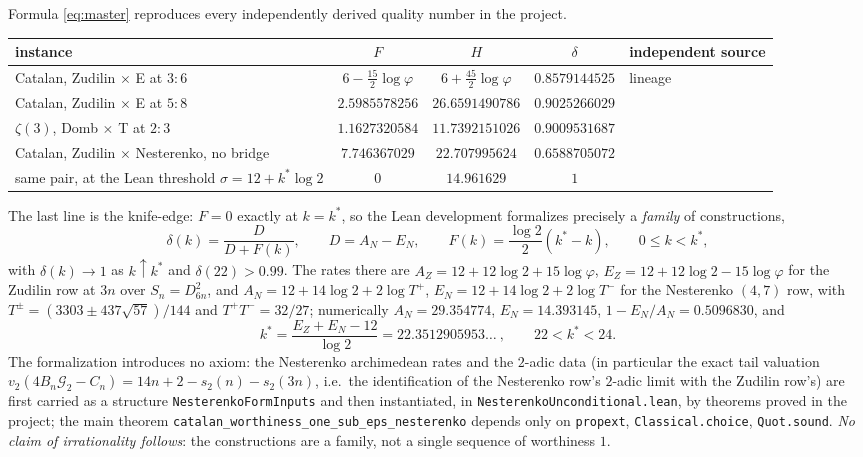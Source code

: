 \begin{remark}[calibration]\label{rem:calibration}
Formula \eqref{eq:master} reproduces every independently derived quality
number in the project.
\begin{center}
\renewcommand{\arraystretch}{1.2}
\begin{tabular}{@{}l c c c l@{}}
\toprule
instance & $F$ & $H$ & $\delta$ & independent source\\
\midrule
Catalan, Zudilin $\times$ E at $3{:}6$ & $6-\tfrac{15}2\log\varphi$ &
$6+\tfrac{45}2\log\varphi$ & $0.8579144525$ & \cite{ProjCatalan58} lineage\\
Catalan, Zudilin $\times$ E at $5{:}8$ & $2.5985578256$ & $26.6591490786$ &
$0.9025266029$ & \cite{ProjCatalan58}\\
$\zeta(3)$, Domb $\times$ T at $2{:}3$ & $1.1627320584$ & $11.7392151026$ &
$0.9009531687$ & \cite{ProjZeta3}\\
Catalan, Zudilin $\times$ Nesterenko, no bridge & $7.746367029$ &
$22.707995624$ & $0.6588705072$ & \cite{ProjCatalanLCM}\\
same pair, at the Lean threshold $\sigma=12+k^*\log2$ & $0$ & $14.961629$ &
$1$ & \cite{LeanCatalan}\\
\bottomrule
\end{tabular}
\end{center}
The last line is the knife-edge: $F=0$ exactly at $k=k^*$, so the Lean
development formalizes precisely a \emph{family} of constructions,
\[
\delta(k)=\frac{D}{D+F(k)},\qquad
D=A_N-E_N,\qquad F(k)=\frac{\log2}{2}(k^*-k),\qquad 0\le k<k^*,
\]
with $\delta(k)\to1$ as $k\uparrow k^*$ and $\delta(22)>0.99$.  The rates there
are $A_Z=12+12\log2+15\log\varphi$, $E_Z=12+12\log2-15\log\varphi$ for the
Zudilin row at $3n$ over $S_n=D_{6n}^2$, and
$A_N=12+14\log2+2\log T^{+}$, $E_N=12+14\log2+2\log T^{-}$ for the Nesterenko
$(4,7)$ row, with $T^{\pm}=(3303\pm437\sqrt{57})/144$ and $T^+T^-=32/27$;
numerically $A_N=29.354774$, $E_N=14.393145$, $1-E_N/A_N=0.5096830$, and
\[
k^*=\frac{E_Z+E_N-12}{\log2}=22.3512905953\ldots\ ,\qquad 22<k^*<24 .
\]
The formalization introduces no axiom: the Nesterenko archimedean rates and
the $2$-adic data (in particular the exact tail valuation
$v_2(4B_n\mathcal G_2-C_n)=14n+2-s_2(n)-s_2(3n)$, i.e.\ the identification of
the Nesterenko row's $2$-adic limit with the Zudilin row's) are first carried
as a structure \texttt{NesterenkoFormInputs} and then instantiated, in
\texttt{NesterenkoUnconditional.lean}, by theorems proved in the project; the
main theorem \texttt{catalan\_worthiness\_one\_sub\_eps\_nesterenko} depends
only on \texttt{propext}, \texttt{Classical.choice}, \texttt{Quot.sound}.  \emph{No claim of
irrationality follows}: the constructions are a family, not a single sequence
of worthiness $1$.
\end{remark}

